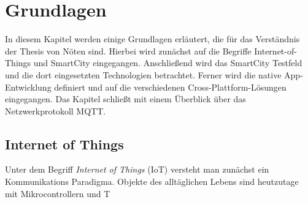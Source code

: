 \chapter{Grundlagen}
\label{ch:grundlagen}
In diesem Kapitel werden einige Grundlagen erläutert, die für das Verständnis der Thesis von Nöten sind. Hierbei wird zunächst auf die Begriffe Internet-of-Things und SmartCity eingegangen. Anschließend wird das SmartCity Testfeld und die dort eingesetzten Technologien betrachtet. Ferner wird die native App-Entwicklung definiert und auf die verschiedenen Cross-Plattform-Lösungen eingegangen. Das Kapitel schließt mit einem Überblick über das Netzwerkprotokoll MQTT. 

\section{Internet of Things}
Unter dem Begriff \textit{Internet of Things} (IoT) versteht man zunächst ein Kommunikations Paradigma. Objekte des alltäglichen Lebens sind heutzutage mit Mikrocontrollern und T